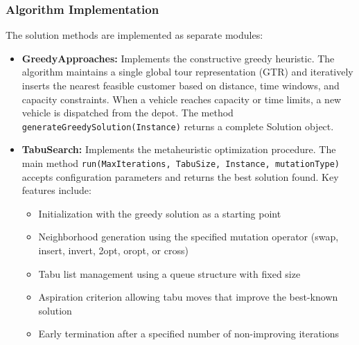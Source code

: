 \subsubsection{Algorithm Implementation}

The solution methods are implemented as separate modules:

\begin{itemize}
    \item \textbf{GreedyApproaches:} Implements the constructive greedy heuristic. The algorithm maintains a single global tour representation (GTR) and iteratively inserts the nearest feasible customer based on distance, time windows, and capacity constraints. When a vehicle reaches capacity or time limits, a new vehicle is dispatched from the depot. The method \texttt{generateGreedySolution(Instance)} returns a complete Solution object.
    
    \item \textbf{TabuSearch:} Implements the metaheuristic optimization procedure. The main method \texttt{run(MaxIterations, TabuSize, Instance, mutationType)} accepts configuration parameters and returns the best solution found. Key features include:
    \begin{itemize}
        \item Initialization with the greedy solution as a starting point
        \item Neighborhood generation using the specified mutation operator (swap, insert, invert, 2opt, oropt, or cross)
        \item Tabu list management using a queue structure with fixed size
        \item Aspiration criterion allowing tabu moves that improve the best-known solution
        \item Early termination after a specified number of non-improving iterations
    \end{itemize}
    

\end{itemize}
